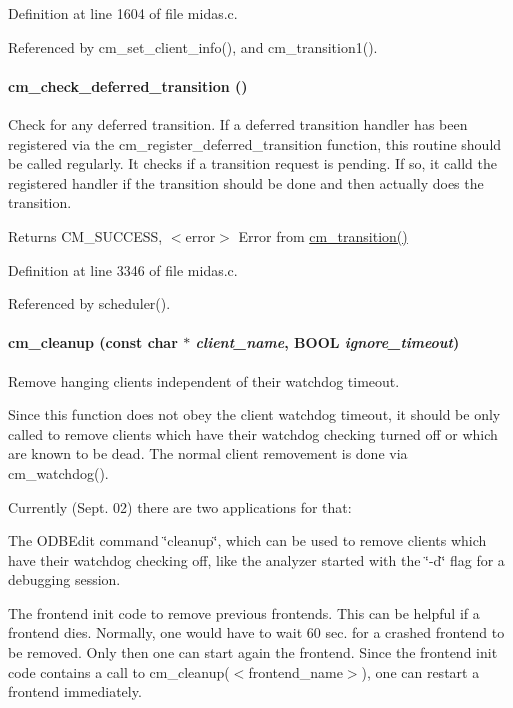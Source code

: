Definition at line 1604 of file midas.c.

Referenced by cm\_\-set\_\-client\_\-info(), and cm\_\-transition1().
\paragraph[{cm\_\-check\_\-deferred\_\-transition}]{ cm\_\-check\_\-deferred\_\-transition ()}\hfill\label{group__cmfunctionc_gabc9cc8ea21e435ffff94d359686897e3}
Check for any deferred transition. If a deferred transition handler has been registered via the cm\_\-register\_\-deferred\_\-transition function, this routine should be called regularly. It checks if a transition request is pending. If so, it calld the registered handler if the transition should be done and then actually does the transition. \begin{DoxyReturn}{Returns}
CM\_\-SUCCESS, $<$error$>$ Error from \hyperlink{group__cmfunctionc_ga376defd443d6bdfcca3830b99986a48d}{cm\_\-transition()} 
\end{DoxyReturn}


Definition at line 3346 of file midas.c.

Referenced by scheduler().
\paragraph[{cm\_\-cleanup}]{ cm\_\-cleanup (const char $\ast$ {\em client\_\-name}, \/  {\bf BOOL} {\em ignore\_\-timeout})}\hfill\label{group__cmfunctionc_ga6208deae04212a3f234d80fe3185f86d}
Remove hanging clients independent of their watchdog timeout.

Since this function does not obey the client watchdog timeout, it should be only called to remove clients which have their watchdog checking turned off or which are known to be dead. The normal client removement is done via cm\_\-watchdog().

Currently (Sept. 02) there are two applications for that:
\begin{DoxyEnumerate}
\item The ODBEdit command \char`\"{}cleanup\char`\"{}, which can be used to remove clients which have their watchdog checking off, like the analyzer started with the \char`\"{}-\/d\char`\"{} flag for a debugging session.
\item The frontend init code to remove previous frontends. This can be helpful if a frontend dies. Normally, one would have to wait 60 sec. for a crashed frontend to be removed. Only then one can start again the frontend. Since the frontend init code contains a call to cm\_\-cleanup($<$frontend\_\-name$>$), one can restart a frontend immediately.
\end{DoxyEnumerate}


